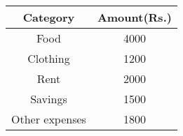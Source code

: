 \begin{tabular}[12pt]{ |c| c|}
    \hline
    \textbf{Category} & \textbf{Amount(Rs.)}\\ 
    \hline
    Food & 4000 \\
    \hline 
    Clothing & 1200 \\
    \hline
    Rent & 2000 \\
    \hline
    Savings & 1500 \\
    \hline
    Other expenses & 1800 \\
    \hline
    \end{tabular}
